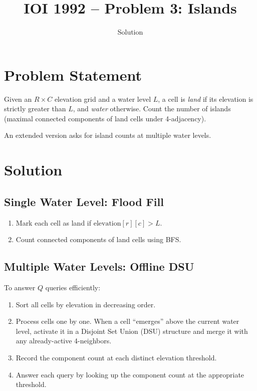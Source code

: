 \documentclass[11pt,a4paper]{article}
\title{IOI 1992 -- Problem 3: Islands}
\author{Solution}
\date{}
\begin{document}
\maketitle

\section{Problem Statement}

Given an $R \times C$ elevation grid and a water level $L$, a cell is
\emph{land} if its elevation is strictly greater than $L$, and \emph{water}
otherwise. Count the number of islands (maximal connected components of land
cells under 4-adjacency).

An extended version asks for island counts at multiple water levels.

\section{Solution}

\subsection{Single Water Level: Flood Fill}

\begin{enumerate}
  \item Mark each cell as land if $\text{elevation}[r][c] > L$.
  \item Count connected components of land cells using BFS.
\end{enumerate}

\subsection{Multiple Water Levels: Offline DSU}

To answer $Q$ queries efficiently:
\begin{enumerate}
  \item Sort all cells by elevation in decreasing order.
  \item Process cells one by one. When a cell ``emerges'' above the current
    water level, activate it in a Disjoint Set Union (DSU) structure and
    merge it with any already-active 4-neighbors.
  \item Record the component count at each distinct elevation threshold.
  \item Answer each query by looking up the component count at the
    appropriate threshold.
\end{enumerate}
\end{document}
